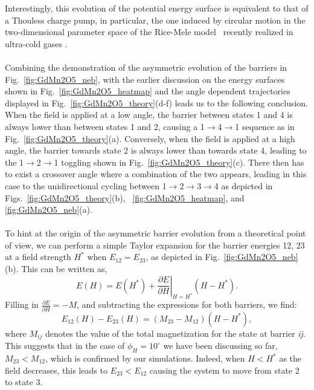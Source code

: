 Interestingly, this evolution of the potential energy surface is equivalent to that of a Thouless charge pump, in particular, the one induced by circular motion in the two-dimensional parameter space of the Rice-Mele model~\cite{Rice82} recently realized in ultra-cold gases \cite{Lohse16,Nakajima16,Atala13}.
\\\\
Combining the demonstration of the asymmetric evolution of the barriers in Fig.~\ref{fig:GdMn2O5_neb}, with the earlier discussion on the energy surfaces shown in Fig.~\ref{fig:GdMn2O5_heatmap} and the angle dependent trajectories displayed in Fig.~\ref{fig:GdMn2O5_theory}(d-f) leads us to the following conclusion.
When the field is applied at a low angle, the barrier between states 1 and 4 is always lower than between states 1 and 2, causing a 1$\rightarrow$4$\rightarrow$1 sequence as in Fig.~\ref{fig:GdMn2O5_theory}(a).
Conversely, when the field is applied at a high angle, the barrier towards state 2 is always lower than towards state 4, leading to the 1$\rightarrow$2$\rightarrow$1 toggling shown in Fig.~\ref{fig:GdMn2O5_theory}(c).
There then has to exist a crossover angle where a combination of the two appears, leading in this case to the unidirectional cycling between 1$\rightarrow$2$\rightarrow$3$\rightarrow$4 as depicted in Figs.~\ref{fig:GdMn2O5_theory}(b), ~\ref{fig:GdMn2O5_heatmap}, and \ref{fig:GdMn2O5_neb}(a).
\\\\
%
To hint at the origin of the asymmetric barrier evolution from a theoretical point of view, we can perform a simple Taylor expansion for the barrier energies 12, 23 at a field strength $H^*$ when $E_{12} = E_{23}$, as depicted in Fig.~\ref{fig:GdMn2O5_neb}(b).
This can be written as,
\begin{equation}
	E(H) = E(H^*) + \left.\frac{\partial E}{\partial H}\right|_{H=H^*}(H - H^*).
\end{equation}
Filling in $\frac{\partial E}{\partial H} = -M$, and subtracting the expressions for both barriers, we find:
\begin{equation}
	E_{12}(H) - E_{23}(H) = (M_{23} - M_{12})(H - H^*),
\end{equation}
where $M_{ij}$ denotes the value of the total magnetization for the state at barrier {\it ij}.
This suggests that in the case of $\phi_H=10^\circ$ we have been discussing so far, $M_{23} < M_{12}$, which is confirmed by our simulations.
Indeed, when $H<H^*$ as the field decreases, this leads to $E_{23} < E_{12}$ causing the system to move from state 2 to state 3.

